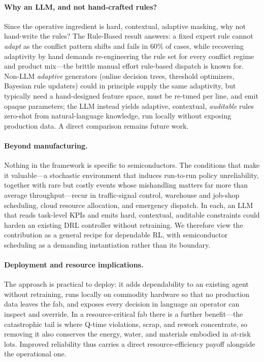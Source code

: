 \documentclass[letterpaper]{article} %
\begin{document}
\paragraph{Why an LLM, and not hand-crafted rules?}
Since the operative ingredient is hard, contextual, adaptive masking, why not
hand-write the rules? The Rule-Based result answers: a fixed expert rule cannot
\emph{adapt} as the conflict pattern shifts and fails in 60\% of cases, while
recovering adaptivity by hand demands re-engineering the rule set for every
conflict regime and product mix---the brittle manual effort rule-based dispatch
is known for. Non-LLM \emph{adaptive} generators (online decision trees,
threshold optimizers, Bayesian rule updaters) could in principle supply the same
adaptivity, but typically need a hand-designed feature space, must be re-tuned per
line, and emit opaque parameters; the LLM instead yields adaptive, contextual,
\emph{auditable} rules zero-shot from natural-language knowledge, run locally
without exposing production data. A direct comparison remains future work.

\paragraph{Beyond manufacturing.}
Nothing in the framework is specific to semiconductors. The conditions that make
it valuable---a stochastic environment that induces run-to-run policy
unreliability, together with rare but costly events whose mishandling matters far
more than average throughput---recur in traffic-signal control, warehouse and
job-shop scheduling, cloud resource allocation, and emergency dispatch. In each,
an LLM that reads task-level KPIs and emits hard, contextual, auditable
constraints could harden an existing DRL controller without retraining. We
therefore view the contribution as a general recipe for dependable RL, with
semiconductor scheduling as a demanding instantiation rather than its boundary.

\paragraph{Deployment and resource implications.}
The approach is practical to deploy: it adds dependability to an existing agent
without retraining, runs locally on commodity hardware so that no production data
leaves the fab, and exposes every decision in language an operator can inspect
and override. In a resource-critical fab there is a further benefit---the
catastrophic tail is where Q-time violations, scrap, and rework concentrate, so
removing it also conserves the energy, water, and materials embodied in at-risk
lots. Improved reliability thus carries a direct resource-efficiency payoff
alongside the operational one.
\end{document}
